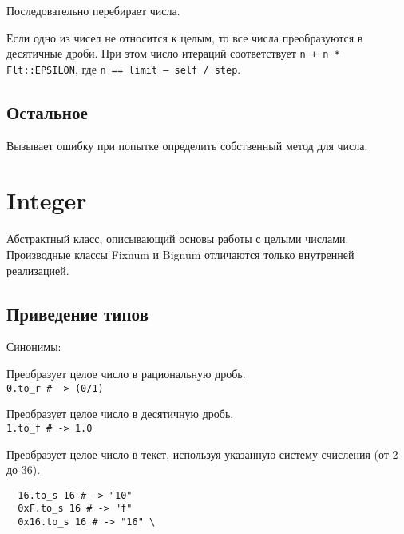 \begin{methodlist}
  Последовательно перебирает числа.

  Если одно из чисел не относится к целым, то все числа преобразуются в десятичные дроби. При этом число итераций соответствует \verb!n + n * Flt::EPSILON!, где \verb!n == limit – self / step!.
\end{methodlist}

\subsection*{Остальное}

\begin{methodlist}
  Вызывает ошибку при попытке определить собственный метод для числа.
\end{methodlist}

\section{Integer}

Абстрактный класс, описывающий основы работы с целыми числами. Производные классы Fixnum и Bignum отличаются только внутренней реализацией.

\subsection*{Приведение типов}

\begin{methodlist}

  Синонимы: 

  Преобразует целое число в рациональную дробь.
  \\\verb!0.to_r # -> (0/1)!

  Преобразует целое число в десятичную дробь.
  \\\verb!1.to_f # -> 1.0!

  Преобразует целое число в текст, используя указанную систему счисления (от 2 до 36).
  \begin{verbatim}
  16.to_s 16 # -> "10"
  0xF.to_s 16 # -> "f" 
  0x16.to_s 16 # -> "16" \
  \end{verbatim}
\end{methodlist}

